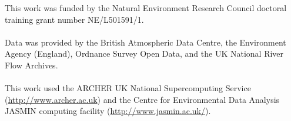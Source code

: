 \afterabstract
%
%
%
\noindent
This work was funded by the Natural Environment Research Council doctoral training grant number NE/L501591/1.
\\~\\
\noindent
Data was provided by the British Atmospheric Data Centre, the Environment Agency (England), Ordnance Survey Open Data, and the UK National River Flow Archives. 
\\~\\
\noindent
This work used the ARCHER UK National Supercomputing Service (\url{http://www.archer.ac.uk}) and the Centre for Environmental Data Analysis JASMIN computing facility (\url{http://www.jasmin.ac.uk/}).
\afterpreface
